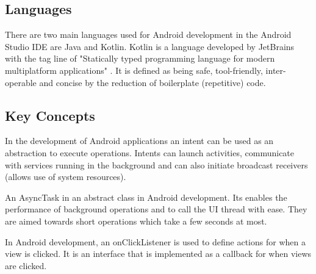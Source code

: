 \tocless\subsection{Languages}
There are two main languages used for Android development in the Android Studio IDE are Java and Kotlin.
Kotlin is a language developed by JetBrains with the tag line of "Statically typed programming language for modern multiplatform applications" \parencite{kotlin}.
It is defined as being safe, tool-friendly, inter-operable and concise by the reduction of boilerplate (repetitive) code.

\tocless\subsection{Key Concepts}
In the development of Android applications an intent can be used as an abstraction to execute operations.
Intents can launch activities, communicate with services running in the background and can also initiate broadcast receivers (allows use of system resources).

An AsyncTask in an abstract class in Android development.
Its enables the performance of background operations and to call the UI thread with ease.
They are aimed towards short operations which take a few seconds at most.

In Android development, an onClickListener is used to define actions for when a view is clicked.
It is an interface that is implemented as a callback for when views are clicked.